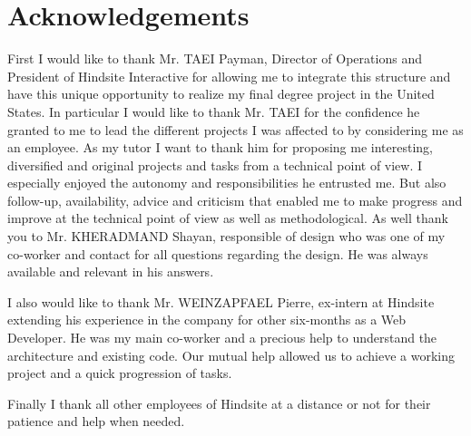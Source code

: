 \chapter*{Acknowledgements}
First I would like to thank Mr. TAEI Payman, Director of Operations and President of
Hindsite Interactive for allowing me to integrate this structure and have this unique
opportunity to realize my final degree project in the United States.
In particular I would like to thank Mr. TAEI for the confidence he granted to me to
lead the different projects I was affected to by considering me as an employee.
As my tutor I want to thank him for proposing me interesting, diversified and original
projects and tasks from a technical point of view. I especially enjoyed the autonomy
and responsibilities he entrusted me. But also follow-up, availability, advice and
criticism that enabled me to make progress and improve at the technical point of
view as well as methodological.
As well thank you to Mr. KHERADMAND Shayan, responsible of design who was
one of my co-worker and contact for all questions regarding the design. He was
always available and relevant in his answers.

I also would like to thank Mr. WEINZAPFAEL Pierre, ex-intern at Hindsite extending his
experience in the company for other six-months as a Web Developer. He was my
main co-worker and a precious help to understand the architecture and existing
code. Our mutual help allowed us to achieve a working project and a quick
progression of tasks.

Finally I thank all other employees of Hindsite at a distance or not for their patience
and help when needed.
